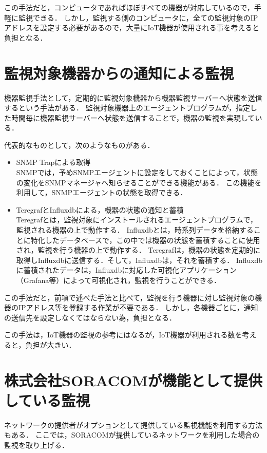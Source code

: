 	この手法だと，コンピュータであればほぼすべての機器が対応しているので，手軽に監視できる．
	しかし，監視する側のコンピュータに，全ての監視対象のIPアドレスを設定する必要があるので，大量にIoT機器が使用される事を考えると負担となる．

\section{監視対象機器からの通知による監視}
	機器監視手法として，定期的に監視対象機器から機器監視サーバーへ状態を送信するという手法がある．
	監視対象機器上のエージェントプログラムが，指定した時間毎に機器監視サーバーへ状態を送信することで，機器の監視を実現している．
	\medskip
	
	代表的なものとして，次のようなものがある．
	\begin{itemize}
		\item SNMP Trapによる取得\\
			SNMPでは，予めSNMPエージェントに設定をしておくことによって，状態の変化をSNMPマネージャへ知らせることができる機能がある．
			この機能を利用して，SNMPエージェントの状態を取得できる．
		\item TeregrafとInfluxdbによる，機器の状態の通知と蓄積\\
					Teregrafとは，監視対象にインストールされるエージェントプログラムで，監視される機器の上で動作する．
					Influxdbとは，時系列データを格納することに特化したデータベースで，この中では機器の状態を蓄積することに使用され，監視を行う機器の上で動作する．
					Teregrafは，機器の状態を定期的に取得しInfluxdbに送信する．そして，Influxdbは，それを蓄積する．
					Influxdbに蓄積されたデータは，Influxdbに対応した可視化アプリケーション（Grafana等）によって可視化され，監視を行うことができる．
	\end{itemize}
	
	この手法だと，前項で述べた手法と比べて，監視を行う機器に対し監視対象の機器のIPアドレス等を登録する作業が不要である．
	しかし，各機器ごとに，通知の送信先を設定しなくてはならない為，負担となる．

	この手法は，IoT機器の監視の参考にはなるが，IoT機器が利用される数を考えると，負担が大きい．

\section{株式会社SORACOMが機能として提供している監視} %
	ネットワークの提供者がオプションとして提供している監視機能を利用する方法もある．
	ここでは，SORACOMが提供しているネットワークを利用した場合の監視を取り上げる．
	
